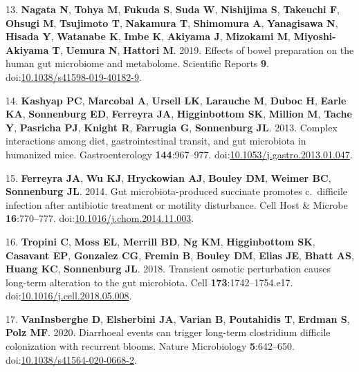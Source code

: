 \documentclass[
  11pt,
]{article}
\begin{document}
\leavevmode\hypertarget{ref-Nagata2019}{}%
13. \textbf{Nagata N}, \textbf{Tohya M}, \textbf{Fukuda S}, \textbf{Suda
W}, \textbf{Nishijima S}, \textbf{Takeuchi F}, \textbf{Ohsugi M},
\textbf{Tsujimoto T}, \textbf{Nakamura T}, \textbf{Shimomura A},
\textbf{Yanagisawa N}, \textbf{Hisada Y}, \textbf{Watanabe K},
\textbf{Imbe K}, \textbf{Akiyama J}, \textbf{Mizokami M},
\textbf{Miyoshi-Akiyama T}, \textbf{Uemura N}, \textbf{Hattori M}. 2019.
Effects of bowel preparation on the human gut microbiome and metabolome.
Scientific Reports \textbf{9}.
doi:\href{https://doi.org/10.1038/s41598-019-40182-9}{10.1038/s41598-019-40182-9}.

\leavevmode\hypertarget{ref-Kashyap2013}{}%
14. \textbf{Kashyap PC}, \textbf{Marcobal A}, \textbf{Ursell LK},
\textbf{Larauche M}, \textbf{Duboc H}, \textbf{Earle KA},
\textbf{Sonnenburg ED}, \textbf{Ferreyra JA}, \textbf{Higginbottom SK},
\textbf{Million M}, \textbf{Tache Y}, \textbf{Pasricha PJ},
\textbf{Knight R}, \textbf{Farrugia G}, \textbf{Sonnenburg JL}. 2013.
Complex interactions among diet, gastrointestinal transit, and gut
microbiota in humanized mice. Gastroenterology \textbf{144}:967--977.
doi:\href{https://doi.org/10.1053/j.gastro.2013.01.047}{10.1053/j.gastro.2013.01.047}.

\leavevmode\hypertarget{ref-Ferreyra2014}{}%
15. \textbf{Ferreyra JA}, \textbf{Wu KJ}, \textbf{Hryckowian AJ},
\textbf{Bouley DM}, \textbf{Weimer BC}, \textbf{Sonnenburg JL}. 2014.
Gut microbiota-produced succinate promotes c.~difficile infection after
antibiotic treatment or motility disturbance. Cell Host \& Microbe
\textbf{16}:770--777.
doi:\href{https://doi.org/10.1016/j.chom.2014.11.003}{10.1016/j.chom.2014.11.003}.

\leavevmode\hypertarget{ref-Tropini2018}{}%
16. \textbf{Tropini C}, \textbf{Moss EL}, \textbf{Merrill BD},
\textbf{Ng KM}, \textbf{Higginbottom SK}, \textbf{Casavant EP},
\textbf{Gonzalez CG}, \textbf{Fremin B}, \textbf{Bouley DM},
\textbf{Elias JE}, \textbf{Bhatt AS}, \textbf{Huang KC},
\textbf{Sonnenburg JL}. 2018. Transient osmotic perturbation causes
long-term alteration to the gut microbiota. Cell
\textbf{173}:1742--1754.e17.
doi:\href{https://doi.org/10.1016/j.cell.2018.05.008}{10.1016/j.cell.2018.05.008}.

\leavevmode\hypertarget{ref-VanInsberghe2020}{}%
17. \textbf{VanInsberghe D}, \textbf{Elsherbini JA}, \textbf{Varian B},
\textbf{Poutahidis T}, \textbf{Erdman S}, \textbf{Polz MF}. 2020.
Diarrhoeal events can trigger long-term clostridium difficile
colonization with recurrent blooms. Nature Microbiology
\textbf{5}:642--650.
doi:\href{https://doi.org/10.1038/s41564-020-0668-2}{10.1038/s41564-020-0668-2}.
\end{document}
